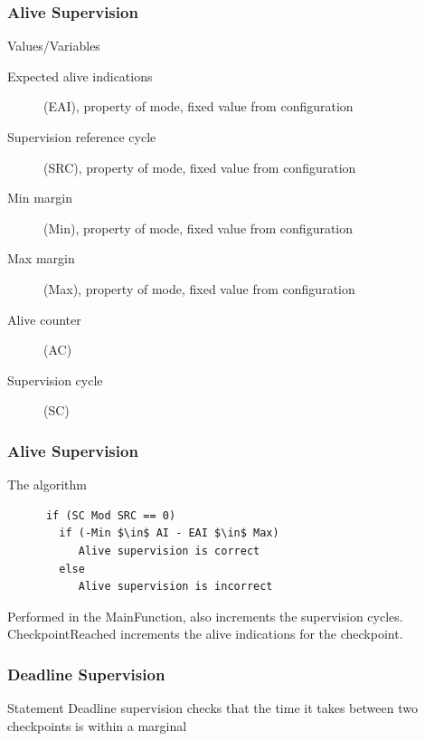 \documentclass{beamer}
\begin{document}
\begin{frame}
  \frametitle{Alive Supervision}
  \begin{block}{Values/Variables}
    \begin{description}
      \item[Expected alive indications] (EAI), property of mode, fixed
        value from configuration
      \item[Supervision reference cycle] (SRC), property of mode, fixed value
        from configuration
      \item[Min margin] (Min), property of mode, fixed value from configuration
      \item[Max margin] (Max), property of mode, fixed value from configuration
      \item[Alive counter] (AC)
      \item[Supervision cycle] (SC)
    \end{description}
  \end{block}
\end{frame}

\begin{frame}[fragile]
  \frametitle{Alive Supervision}
  \begin{block}{The algorithm}
    \begin{lstlisting}
      if (SC Mod SRC == 0)
        if (-Min $\in$ AI - EAI $\in$ Max)
           Alive supervision is correct
        else
           Alive supervision is incorrect
    \end{lstlisting}
  \end{block}
  Performed in the MainFunction, also increments the supervision
  cycles.\\
  CheckpointReached increments the alive indications for the
  checkpoint.
\end{frame}

\begin{frame}
  \frametitle{Deadline Supervision}
  \begin{block}{Statement}
    Deadline supervision checks that the time it takes between two
    checkpoints is within a marginal
  \end{block}
\end{frame}
\end{document}
